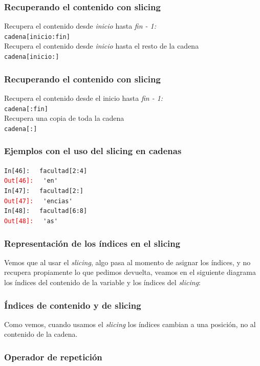 \documentclass[12pt]{beamer}
\begin{document}
{\begin{frame}[fragile]
\frametitle{Recuperando el contenido con slicing}
Recupera el contenido desde \emph{inicio} hasta \emph{fin - 1:}
\\
\bigskip
\verb|cadena[inicio:fin]|
\\
\bigskip
\pause
Recupera el contenido desde \emph{inicio} hasta el resto de la cadena
\\
\bigskip
\verb|cadena[inicio:]|
\end{frame}
\begin{frame}[fragile]
\frametitle{Recuperando el contenido con slicing}
Recupera el contenido desde el inicio hasta \emph{fin - 1:}
\\
\bigskip
\verb|cadena[:fin]|
\\
\bigskip
\pause
Recupera una copia de toda la cadena
\\
\bigskip
\verb|cadena[:]|
\end{frame}
\begin{frame}[fragile]
\frametitle{Ejemplos con el uso del slicing en cadenas}
\textcolor{ao}{\texttt{In[46]: }} \verb| facultad[2:4]|
\\
\pause
\textcolor{red}{\texttt{Out[46]: }} \verb| 'en'|
\\
\bigskip
\pause
\textcolor{ao}{\texttt{In[47]: }} \verb| facultad[2:]|
\\
\pause
\textcolor{red}{\texttt{Out[47]: }} \verb| 'encias'|
\pause
\\
\bigskip
\pause
\textcolor{ao}{\texttt{In[48]: }} \verb| facultad[6:8]|
\\
\pause
\textcolor{red}{\texttt{Out[48]: }} \verb| 'as'|
\end{frame}
\begin{frame}[fragile]
\frametitle{Representación de los índices en el slicing}
Vemos que al usar el \emph{slicing}, algo pasa al momento de asignar los índices, y no recupera propiamente lo que pedimos devuelta, veamos en el siguiente diagrama los índices del contenido de la variable y los índices del \emph{slicing}:
\end{frame}
\begin{frame}[fragile]
\frametitle{Índices de contenido y de slicing}
\begin{figure}
	
\end{figure}
Como vemos, cuando usamos el \emph{slicing} los índices cambian a una posición, no al contenido de la cadena.
\end{frame}
\begin{frame}[fragile]
\frametitle{Operador de repetición}

\end{frame}}
\end{document}
